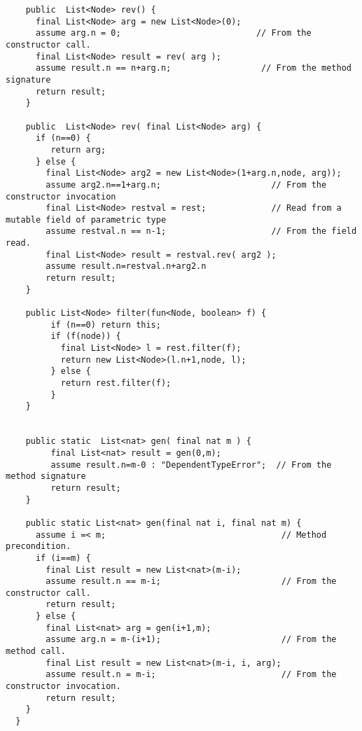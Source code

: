 \documentclass{article}
\begin{document}
\begin{table}
{\footnotesize
\begin{verbatim}
    public  List<Node> rev() {
      final List<Node> arg = new List<Node>(0);
      assume arg.n = 0;                           // From the constructor call.
      final List<Node> result = rev( arg );
      assume result.n == n+arg.n;                  // From the method signature
      return result;
    }

    public  List<Node> rev( final List<Node> arg) {
      if (n==0) {
         return arg;
      } else {
        final List<Node> arg2 = new List<Node>(1+arg.n,node, arg));
        assume arg2.n==1+arg.n;                      // From the constructor invocation
        final List<Node> restval = rest;             // Read from a mutable field of parametric type
        assume restval.n == n-1;                     // From the field read.
        final List<Node> result = restval.rev( arg2 );
        assume result.n=restval.n+arg2.n
        return result;
    }

    public List<Node> filter(fun<Node, boolean> f) {
         if (n==0) return this;
         if (f(node)) {
           final List<Node> l = rest.filter(f);
           return new List<Node>(l.n+1,node, l);
         } else {
           return rest.filter(f);
         }
    }


    public static  List<nat> gen( final nat m ) {
         final List<nat> result = gen(0,m);
         assume result.n=m-0 : "DependentTypeError";  // From the method signature
         return result;
    }

    public static List<nat> gen(final nat i, final nat m) {
      assume i =< m;                                   // Method precondition.
      if (i==m) {
        final List result = new List<nat>(m-i);  
        assume result.n == m-i;                        // From the constructor call.
        return result;
      } else {
        final List<nat> arg = gen(i+1,m); 
        assume arg.n = m-(i+1);                        // From the method call.
        final List result = new List<nat>(m-i, i, arg);
        assume result.n = m-i;                         // From the constructor invocation.
        return result;
    }
  }  
\end{verbatim}}
\caption{Translation of {\tt List} (contd.}\label{assume-table2}
\end{table}
\end{document}
